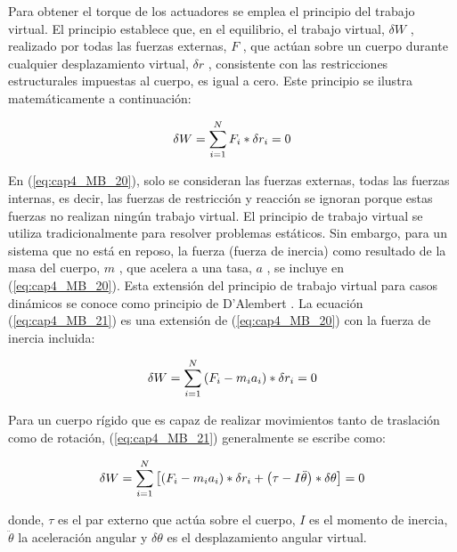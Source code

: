         Para obtener el torque de los actuadores se emplea el principio del trabajo virtual. El principio establece que, en el equilibrio, el trabajo virtual,  $\delta W$  , realizado por todas las fuerzas externas, $F$ , que actúan sobre un cuerpo durante cualquier desplazamiento virtual,  $\delta r $  , consistente con las restricciones estructurales impuestas al cuerpo, es igual a cero. Este principio se ilustra matemáticamente a continuación:
        
        \begin{equation}
            \delta W= \sum _{i=1}^{N}F_{i} \ast \delta r_{i}=0\\
            \label{eq:cap4_MB_20}
        \end{equation}

        
        En (\ref{eq:cap4_MB_20}), solo se consideran las fuerzas externas, todas las fuerzas internas, es decir, las fuerzas de restricción y reacción se ignoran porque estas fuerzas no realizan ningún trabajo virtual. El principio de trabajo virtual se utiliza tradicionalmente para resolver problemas estáticos. Sin embargo, para un sistema que no está en reposo, la fuerza (fuerza de inercia) como resultado de la masa del cuerpo,  \( m \) , que acelera a una tasa,  \( a \) , se incluye en (\ref{eq:cap4_MB_20}). Esta extensión del principio de trabajo virtual para casos dinámicos se conoce como principio de D'Alembert \cite{}. La ecuación (\ref{eq:cap4_MB_21}) es una extensión de  (\ref{eq:cap4_MB_20}) con la fuerza de inercia incluida:
        
        \begin{equation}
          \delta W= \sum _{i=1}^{N} \left( F_{i}-m_{i}a_{i} \right) \ast \delta r_{i}=0 \\
         \label{eq:cap4_MB_21}
        \end{equation}

        
        Para un cuerpo rígido que es capaz de realizar movimientos tanto de traslación como de rotación, (\ref{eq:cap4_MB_21}) generalmente se escribe como:
        
        \begin{equation}
          \delta W= \sum _{i=1}^{N} \left[  \left( F_{i}-m_{i}a_{i} \right) \ast \delta r_{i}+ \left(  \tau-I\ddot{ \theta } \right) \ast \delta  \theta  \right] =0 \\
         \label{eq:cap4_MB_22}
        \end{equation}
        
        donde,  $\tau $  es el par externo que actúa sobre el cuerpo,  $ I $  es el momento de inercia,  $\ddot{ \theta }$   la aceleración angular y  $ \delta  \theta  $  es el desplazamiento angular virtual.
        

